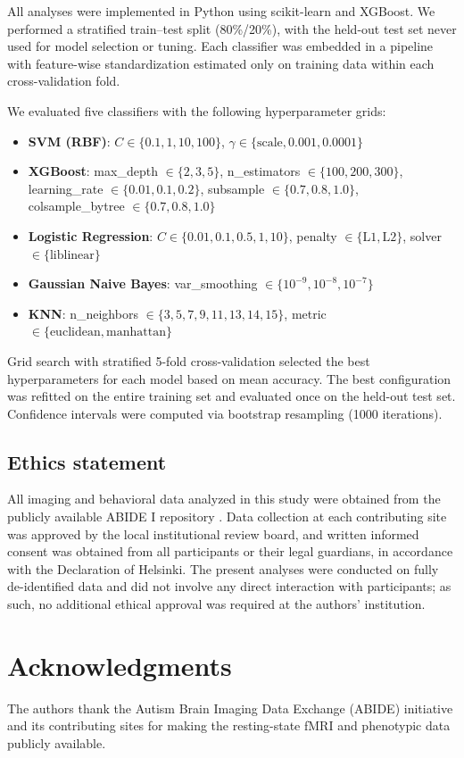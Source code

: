 \documentclass[10pt,letterpaper]{article}
\begin{document}
All analyses were implemented in Python using scikit-learn and XGBoost. We performed a stratified
train--test split (80\%/20\%), with the held-out test set never used for model selection or tuning.
Each classifier was embedded in a pipeline with feature-wise standardization estimated only on
training data within each cross-validation fold.

We evaluated five classifiers with the following hyperparameter grids:
\begin{itemize}
    \item \textbf{SVM (RBF)}: $C \in \{0.1, 1, 10, 100\}$, $\gamma \in \{\text{scale}, 0.001, 0.0001\}$
    \item \textbf{XGBoost}: max\_depth $\in \{2, 3, 5\}$, n\_estimators $\in \{100, 200, 300\}$, learning\_rate $\in \{0.01, 0.1, 0.2\}$, subsample $\in \{0.7, 0.8, 1.0\}$, colsample\_bytree $\in \{0.7, 0.8, 1.0\}$
    \item \textbf{Logistic Regression}: $C \in \{0.01, 0.1, 0.5, 1, 10\}$, penalty $\in \{\mathrm{L1}, \mathrm{L2}\}$, solver $\in \{\mathrm{liblinear}\}$
    \item \textbf{Gaussian Naive Bayes}: var\_smoothing $\in \{10^{-9}, 10^{-8}, 10^{-7}\}$
    \item \textbf{KNN}: n\_neighbors $\in \{3, 5, 7, 9, 11, 13, 14, 15\}$, metric $\in \{\mathrm{euclidean}, \mathrm{manhattan}\}$
\end{itemize}

Grid search with stratified 5-fold cross-validation selected the best hyperparameters for each
model based on mean accuracy. The best configuration was refitted on the entire training set and
evaluated once on the held-out test set. Confidence intervals were computed via bootstrap
resampling (1000 iterations).

\subsection*{Ethics statement}

All imaging and behavioral data analyzed in this study were obtained from the publicly available
ABIDE I repository \cite{DiMartino:2014abide}. Data collection at each contributing site was
approved by the local institutional review board, and written informed consent was obtained from
all participants or their legal guardians, in accordance with the Declaration of Helsinki. The
present analyses were conducted on fully de-identified data and did not involve any direct
interaction with participants; as such, no additional ethical approval was required at the authors'
institution.

\section*{Acknowledgments}

The authors thank the Autism Brain Imaging Data Exchange (ABIDE) initiative and its contributing
sites for making the resting-state fMRI and phenotypic data publicly available.

\nolinenumbers



\clearpage
\end{document}
